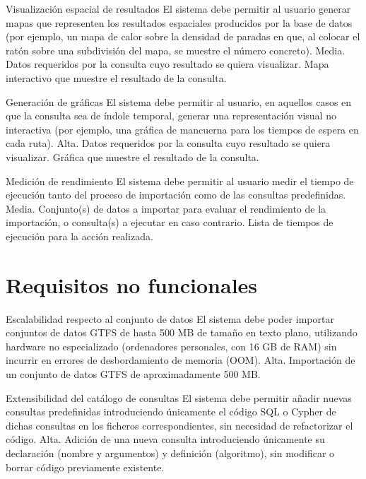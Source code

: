\freq
    {Visualización espacial de resultados}
    {El sistema debe permitir al usuario generar mapas que representen los resultados espaciales producidos por la base de datos (por ejemplo, un mapa de calor sobre la densidad de paradas en que, al colocar el ratón sobre una subdivisión del mapa, se muestre el número concreto).}
    {Media.}
    {Datos requeridos por la consulta cuyo resultado se quiera visualizar.}
    {Mapa interactivo que muestre el resultado de la consulta.}
    {}
    
\freq
    {Generación de gráficas}
    {El sistema debe permitir al usuario, en aquellos casos en que la consulta sea de índole temporal, generar una representación visual no interactiva (por ejemplo, una gráfica de mancuerna para los tiempos de espera en cada ruta).}
    {Alta.}
    {Datos requeridos por la consulta cuyo resultado se quiera visualizar.}
    {Gráfica que muestre el resultado de la consulta.}
    {}

\freq
    {Medición de rendimiento}
    {El sistema debe permitir al usuario medir el tiempo de ejecución tanto del proceso de importación como de las consultas predefinidas.}
    {Media.}
    {Conjunto(s) de datos a importar para evaluar el rendimiento de la importación, o consulta(s) a ejecutar en caso contrario.}
    {Lista de tiempos de ejecución para la acción realizada.}
    {}


\section{Requisitos no funcionales}

\nfreq
    {Escalabilidad respecto al conjunto de datos}
    {El sistema debe poder importar conjuntos de datos GTFS de hasta 500 MB de tamaño en texto plano, utilizando hardware no especializado (ordenadores personales, con 16 GB de RAM) sin incurrir en errores de desbordamiento de memoria (OOM).}
    {Alta.}
    {Importación de un conjunto de datos GTFS de aproximadamente 500 MB.}

\nfreq
    {Extensibilidad del catálogo de consultas}
    {El sistema debe permitir añadir nuevas consultas predefinidas introduciendo únicamente el código SQL o Cypher de dichas consultas en los ficheros correspondientes, sin necesidad de refactorizar el código.}
    {Alta.}
    {Adición de una nueva consulta introduciendo únicamente su declaración (nombre y argumentos) y definición (algoritmo), sin modificar o borrar código previamente existente.}

